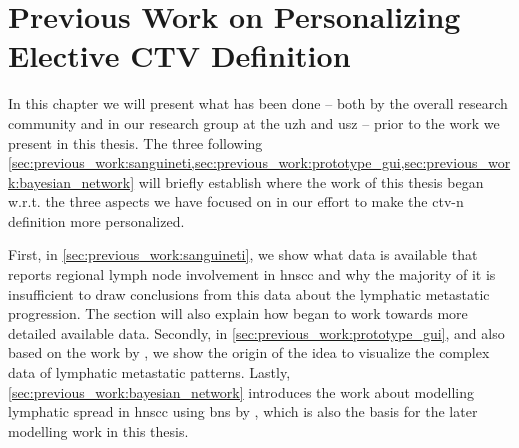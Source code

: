 \documentclass[\relativeRoot/main.tex]{subfiles}
\begin{document}
\chapter[Previous Work on Personalizing CTV-N Definition]{Previous Work on Personalizing Elective CTV Definition}
\label{chap:previous_work}

In this chapter we will present what has been done -- both by the overall research community and in our research group at the \gls{uzh} and \gls{usz} -- prior to the work we present in this thesis. The three following \cref{sec:previous_work:sanguineti,sec:previous_work:prototype_gui,sec:previous_work:bayesian_network} will briefly establish where the work of this thesis began w.r.t. the three aspects we have focused on in our effort to make the \acrfull{ctv-n} definition more personalized.

First, in \cref{sec:previous_work:sanguineti}, we show what data is available that reports regional lymph node involvement in \gls{hnscc} and why the majority of it is insufficient to draw conclusions from this data about the lymphatic metastatic progression. The section will also explain how  began to work towards more detailed available data. Secondly, in \cref{sec:previous_work:prototype_gui}, and also based on the work by , we show the origin of the idea to visualize the complex data of lymphatic metastatic patterns. Lastly, \cref{sec:previous_work:bayesian_network} introduces the work about modelling lymphatic spread in \gls{hnscc} using \glspl{bn} by , which is also the basis for the later modelling work in this thesis.




\end{document}

